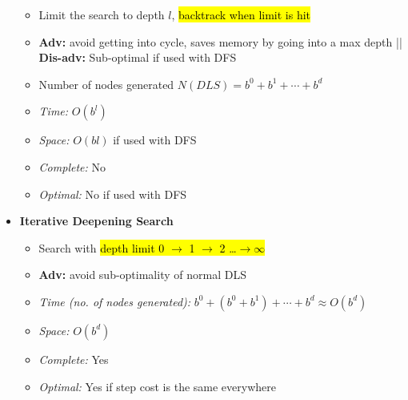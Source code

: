 \documentclass[10pt,landscape]{article}
\begin{document}
\begin{multicols*}{3}
\begin{multicols*}{2}
\begin{itemize}[topsep=0pt,noitemsep,wide=0pt, leftmargin=\dimexpr{} + 2\relax]
  \begin{itemize}[topsep=0pt,noitemsep,wide=0pt, leftmargin=\dimexpr{} + 2\relax]
    \item Limit the search to depth $l$, \hl{backtrack when limit is hit}
    \item \textbf{Adv:} avoid getting into cycle, saves memory by going into a max depth || \textbf{Dis-adv:} Sub-optimal if used with DFS
    \item Number of nodes generated $N(DLS) = b^0 + b^1 + \cdots + b^d$
  \end{itemize}
  \begin{itemize}[topsep=0pt,noitemsep,wide=0pt, leftmargin=\dimexpr{} + 2\relax]
    \item \textit{Time:} $O(b^l)$
    \item \textit{Space:} $O(bl)$ if used with DFS
    \item \textit{Complete:} No
    \item \textit{Optimal:} No if used with DFS
  \end{itemize}
  \item \textbf{Iterative Deepening Search} 
  \begin{itemize}[topsep=0pt,noitemsep,wide=0pt, leftmargin=\dimexpr{} + 2\relax]
    \item Search with \hl{depth limit 0 $\rightarrow$ 1 $\rightarrow$ 2 \ldots $\rightarrow \infty$}
    \item \textbf{Adv:} avoid sub-optimality of normal DLS
  \end{itemize}
  \begin{itemize}[topsep=0pt,noitemsep,wide=0pt, leftmargin=\dimexpr{} + 2\relax]
    \item \textit{Time (no. of nodes generated):} $b^0 + (b^0 + b^1) + \cdots + b^d \approx O(b^d)$
    \item \textit{Space:} $O(b^d)$ 
    \item \textit{Complete:} Yes
    \item \textit{Optimal:} Yes if step cost is the same everywhere
  \end{itemize}
\end{itemize}
\end{multicols*}


\end{multicols*}
\end{document}
